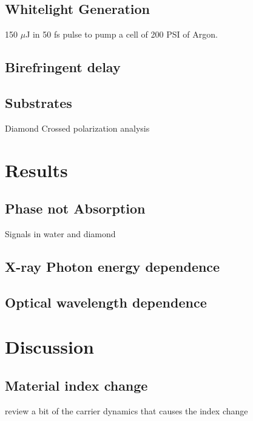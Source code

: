 \documentclass{article}
\begin{document}
\subsection{Whitelight Generation}
150 $\mu$J in 50 fs pulse to pump a cell of 200 PSI of Argon. 
\subsection{Birefringent delay}
\subsection{Substrates}
Diamond
Crossed polarization analysis

\section{Results}
\subsection{Phase not Absorption}
Signals in water and diamond
\subsection{X-ray Photon energy dependence}
\subsection{Optical wavelength dependence}

\section{Discussion}
\subsection{Material index change}
review a bit of the carrier dynamics that causes the index change
\end{document}
